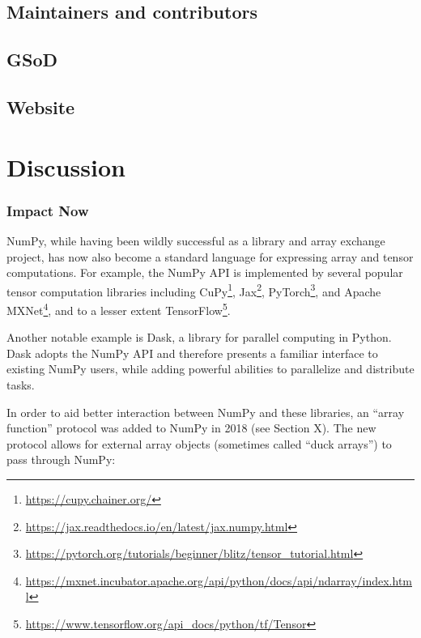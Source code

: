 \documentclass[fleqn,10pt]{wlscirep}
\begin{document}

\subsection*{Maintainers and contributors}



\subsection*{GSoD}

\subsection*{Website}

\section*{Discussion}

\subsubsection*{Impact Now}

NumPy, while having been wildly successful as a library and array
exchange project, has now also become a standard language for expressing array
and tensor computations.  For example, the NumPy API is implemented by
several popular tensor computation libraries including
CuPy\footnote{\url{https://cupy.chainer.org/}},
Jax\footnote{\url{https://jax.readthedocs.io/en/latest/jax.numpy.html}},
PyTorch\footnote{\url{https://pytorch.org/tutorials/beginner/blitz/tensor\_tutorial.html}}, and
Apache MXNet\footnote{\url{https://mxnet.incubator.apache.org/api/python/docs/api/ndarray/index.html}},
and to a lesser extent
TensorFlow\footnote{\url{https://www.tensorflow.org/api\_docs/python/tf/Tensor}}.

Another notable example is Dask, a library for parallel computing in
Python.  Dask adopts the NumPy API and therefore presents a familiar
interface to existing NumPy users, while adding powerful abilities to
parallelize and distribute tasks.

In order to aid better interaction between NumPy and these libraries,
an ``array function'' protocol was added to NumPy in 2018 (see Section
X). The new protocol allows for external array objects (sometimes
called ``duck arrays'') to pass through NumPy:
\end{document}
